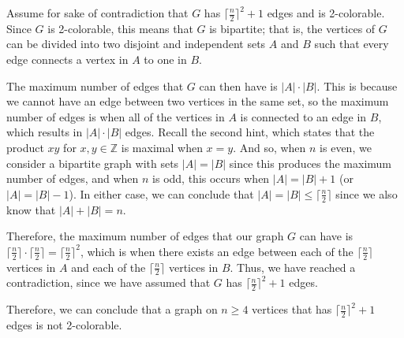 \documentclass[12pt,letterpaper]{article}
\newcommand\Z{\mathbb Z}
\begin{document}
\begin{enumerate}
\begin{mdframed}
Assume for sake of contradiction that $G$ has $\lceil\frac{n}{2}\rceil^2 + 1$ edges and is 2-colorable. Since $G$ is 2-colorable, this means that $G$ is bipartite; that is, the vertices of $G$ can be divided into two disjoint and independent sets $A$ and $B$ such that every edge connects a vertex in $A$ to one in $B$.

The maximum number of edges that $G$ can then have is $|A| \cdot |B|$. This is because we cannot have an edge between two vertices in the same set, so the maximum number of edges is when all of the vertices in $A$ is connected to an edge in $B$, which results in $|A| \cdot |B|$ edges. Recall the second hint, which states that the product $xy$ for $x, y \in \Z$ is maximal when $x=y$. And so, when $n$ is even, we consider a bipartite graph with sets $|A| = |B|$ since this produces the maximum number of edges, and when $n$ is odd, this occurs when  $|A| = |B| + 1$ (or $|A| = |B| - 1$). In either case, we can conclude that $|A| = |B| \leq \lceil \frac{n}{2}\rceil$ since we also know that $|A| + |B| = n$.

Therefore, the maximum number of edges that our graph $G$ can have is $\lceil \frac{n}{2}\rceil \cdot \lceil \frac{n}{2}\rceil = \lceil \frac{n}{2}\rceil^2$, which is when there exists an edge between each of the $\lceil \frac{n}{2}\rceil$ vertices in $A$ and each of the $\lceil \frac{n}{2}\rceil$ vertices in $B$. Thus, we have reached a contradiction, since we have assumed that $G$ has $\lceil\frac{n}{2}\rceil^2 + 1$ edges.

Therefore, we can conclude that a graph on $n \geq 4$ vertices that has $\lceil\frac{n}{2}\rceil^2 + 1$ edges is not 2-colorable.
\end{mdframed}
\end{enumerate}
\end{document}
